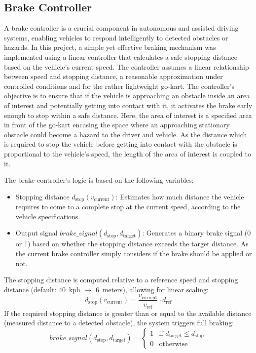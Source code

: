 \subsection{Brake Controller}

A brake controller is a crucial component in autonomous and assisted driving systems, enabling vehicles to respond intelligently to detected obstacles or hazards.
In this project, a simple yet effective braking mechanism was implemented using a linear controller that calculates a safe stopping distance based on the vehicle's current speed.
The controller assumes a linear relationship between speed and stopping distance, a reasonable approximation under controlled conditions and for the rather lightweight go-kart.
The controller's objective is to ensure that if the vehicle is approaching an obstacle inside an area of interest and potentially getting into contact with it, it activates the brake early enough to stop within a safe distance.
Here, the area of interest is a specified area in front of the go-kart encasing the space where an approaching stationary obstacle could become a hazard to the driver and vehicle.
As the distance which is required to stop the vehicle before getting into contact with the obstacle is proportional to the vehicle's speed, the length of the area of interest is coupled to it.
\par
The brake controller's logic is based on the following variables:
\begin{itemize}
    \item Stopping distance $d_{\text{stop}}(v_{\text{current}})$: Estimates how much distance the vehicle requires to come to a complete stop at the current speed, according to the vehicle specifications.
    \item Output signal $brake\_signal(d_{\text{stop}},d_{\text{target}})$: Generates a binary brake signal (0 or 1) based on whether the stopping distance exceeds the target distance. As the current brake controller simply considers if the brake should be applied or not.
\end{itemize}
The stopping distance is computed relative to a reference speed and stopping distance (default: 40~kph $\rightarrow$ 6~meters), allowing for linear scaling:
\[
d_{\text{stop}}(v_{\text{current}}) = \frac{v_{\text{current}}}{v_{\text{ref}}} \cdot d_{\text{ref}}
\]
If the required stopping distance is greater than or equal to the available distance (measured distance to a detected obstacle), the system triggers full braking:
\[
brake\_signal(d_{\text{stop}},d_{\text{target}}) =
\begin{cases}
1 & \text{if } d_{\text{target}} \leq d_{\text{stop}} \\
0 & \text{otherwise}
\end{cases}
\]

